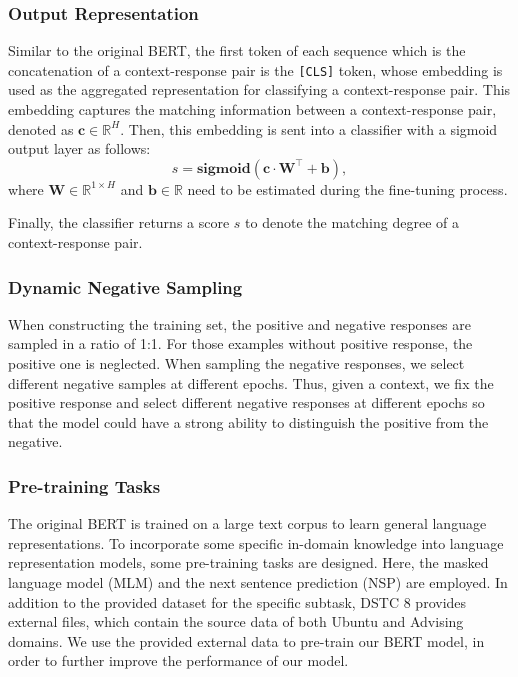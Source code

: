 \documentclass[letterpaper]{article} \usepackage{aaai20}  \usepackage{times}  \usepackage{helvet} \usepackage{courier}  \usepackage[hyphens]{url}  \usepackage{graphicx} \urlstyle{rm} \def\UrlFont{\rm}  \usepackage{graphicx}  \frenchspacing  \setlength{\pdfpagewidth}{8.5in}  \setlength{\pdfpageheight}{11in}
\begin{document}
  \subsubsection{Output Representation}
    Similar to the original BERT, the first token of each sequence which is the concatenation of a context-response pair is the \texttt{[CLS]} token, whose embedding is used as the aggregated representation for classifying a context-response pair.
    This embedding captures the matching information between a context-response pair, denoted as $\textbf{c} \in \mathbb{R}^H$.
    Then, this embedding is sent into a classifier with a sigmoid output layer as follows:
    \begin{equation}
      s = \textbf{sigmoid}(\textbf{c} \cdot \textbf{W}^\top + \textbf{b}),
    \end{equation}
    where $\textbf{W} \in \mathbb{R}^{1\times H}$ and $\textbf{b} \in \mathbb{R}$ need to be estimated during the fine-tuning process.

    Finally, the classifier returns a score $s$ to denote the matching degree of a context-response pair.

  \subsubsection{Dynamic Negative Sampling}
    When constructing the training set, the positive and negative responses are sampled in a ratio of 1:1.
    For those examples without positive response, the positive one is neglected.
    When sampling the negative responses, we select different negative samples at different epochs.
    Thus, given a context, we fix the positive response and select different negative responses at different epochs so that the model could have a strong ability to distinguish the positive from the negative.

  \subsubsection{Pre-training Tasks}
    The original BERT is trained on a large text corpus to learn general language representations.
    To incorporate some specific in-domain knowledge into language representation models, some pre-training tasks are designed.
    Here, the masked language model (MLM) and the next sentence prediction (NSP) \cite{DBLP:conf/naacl/DevlinCLT19} are employed.
    In addition to the provided dataset for the specific subtask, DSTC 8 provides external files, which contain the source data of both Ubuntu and Advising domains.
    We use the provided external data to pre-train our BERT model, in order to further improve the performance of our model.
\end{document}
